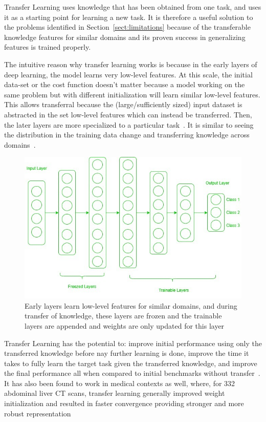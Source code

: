 \documentclass[12pt,twoside]{report}
\begin{document}
Transfer Learning uses knowledge that has been obtained from one task, and uses it as a starting point for learning a new task. It is therefore a useful solution to the problems identified in Section~\ref{sect:limitations} because of the transferable knowledge features for similar domains  and its proven success in generalizing features is trained properly.

The intuitive reason why transfer learning works is because in the early layers of deep learning, the model learns very low-level features. At this scale, the initial data-set or the cost function doesn't matter because a model working on the same problem but with different initialization will learn similar low-level features. This allows transferral because the (large/sufficiently sized) input dataset is abstracted in the set low-level features which can instead be transferred. Then, the later layers are more specialized to a particular task~\cite{deep-learning-book}. It is similar to seeing the distribution in the training data change and transferring knowledge across domains~\cite{survey-on-transfer-learning}.

\begin{figure}[H]
  \centering
  \includegraphics[width=0.7\linewidth]{../figures/Frozen-layers.jpg}
  \caption{Early layers learn low-level features for similar domains, and during transfer of knowledge, these layers are frozen and the trainable layers are appended and weights are only updated for this layer~\cite{geeks-transfer-learning}}
 \label{fig:frozen-layers}
\end{figure}

Transfer Learning has the potential to: improve initial performance using only the transferred knowledge before nay further learning is done, improve the time it takes to fully learn the target task given the transferred knowledge, and improve the final performance all when compared to initial benchmarks without transfer~\cite{torrey-handbook}. It has also been found to work in medical contexts as well, where, for 332 abdominal liver CT scans, transfer learning generally improved weight initialization and resulted in faster convergence providing stronger and more robust representation~\cite{liver-lesion-via-transfer-learning}
\end{document}
